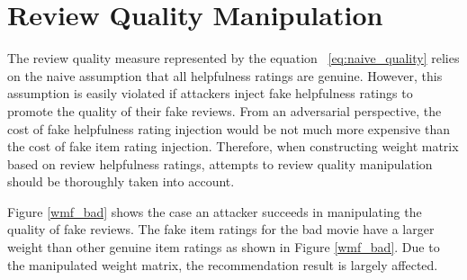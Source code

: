 \documentclass[master,english,final]{kaist-ucs}
\begin{document}
\section{Review Quality Manipulation}
The review quality measure  represented by the equation ~\ref{eq:naive_quality} relies on the naive assumption that all helpfulness ratings are genuine.
However, this assumption is easily violated if attackers inject fake helpfulness ratings to promote the quality of their fake reviews.
From an adversarial perspective, the cost of fake helpfulness rating injection would be not much more expensive than the cost of fake item rating injection.
Therefore, when constructing weight matrix based on review helpfulness ratings, attempts to review quality manipulation should be thoroughly taken into account.

Figure \ref{wmf_bad} shows the case an attacker succeeds in manipulating the quality of fake reviews.
The fake item ratings for the bad movie have a larger weight than other genuine item ratings as shown in Figure \ref{wmf_bad}.
Due to the manipulated weight matrix, the recommendation result is largely affected.
\end{document}
